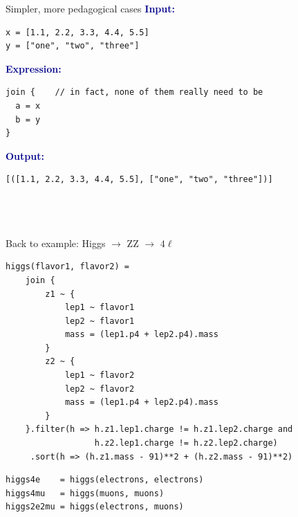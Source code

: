 \documentclass[aspectratio=169]{beamer}
\begin{document}
\begin{frame}[fragile]{Simpler, more pedagogical cases}
\vspace{0.25 cm}
\textcolor{darkblue}{\large\bf Input:}

\begin{verbatim}
x = [1.1, 2.2, 3.3, 4.4, 5.5]
y = ["one", "two", "three"]
\end{verbatim}

\vspace{0.25 cm}
\textcolor{darkblue}{\large\bf Expression:}

\begin{verbatim}
join {    // in fact, none of them really need to be
  a = x
  b = y
}
\end{verbatim}

\vspace{0.25 cm}
\textcolor{darkblue}{\large\bf Output:}

\begin{verbatim}
[([1.1, 2.2, 3.3, 4.4, 5.5], ["one", "two", "three"])]




\end{verbatim}
\end{frame}

\begin{frame}[fragile]{Back to example: Higgs $\to$ ZZ $\to$ $4\ell$}
\small
\begin{verbatim}
higgs(flavor1, flavor2) =
    join {
        z1 ~ {
            lep1 ~ flavor1
            lep2 ~ flavor1
            mass = (lep1.p4 + lep2.p4).mass
        }
        z2 ~ {
            lep1 ~ flavor2
            lep2 ~ flavor2
            mass = (lep1.p4 + lep2.p4).mass
        }
    }.filter(h => h.z1.lep1.charge != h.z1.lep2.charge and
                  h.z2.lep1.charge != h.z2.lep2.charge)
     .sort(h => (h.z1.mass - 91)**2 + (h.z2.mass - 91)**2)
\end{verbatim}
\begin{verbatim}
higgs4e    = higgs(electrons, electrons)
higgs4mu   = higgs(muons, muons)
higgs2e2mu = higgs(electrons, muons)
\end{verbatim}
\end{frame}
\end{document}
